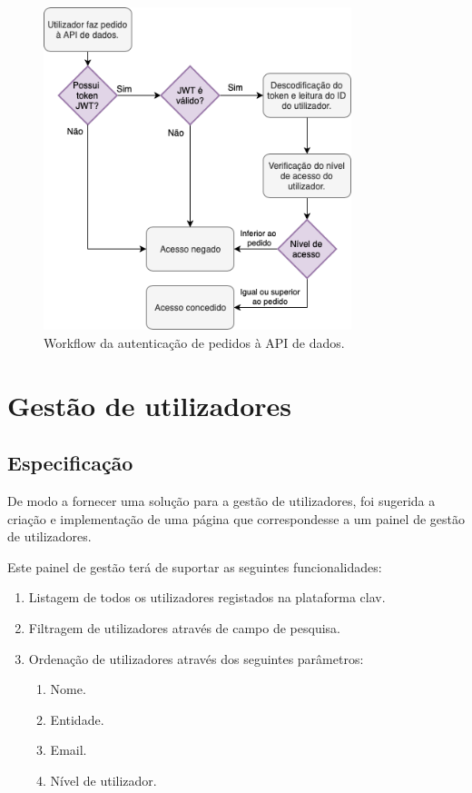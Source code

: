 \begin{figure}[h!]
    \centering
    \includegraphics[width=0.8\textwidth]{img/diagramas/authAPI/AuthAPI.png}
    \caption{Workflow da autenticação de pedidos à API de dados.}
    \label{fig:flow_authCC}
\end{figure}

\cleardoublepage
\section{Gestão de utilizadores}

\subsection{Especificação}
De modo a fornecer uma solução para a gestão de utilizadores, foi sugerida a criação e implementação de uma página que correspondesse a um painel de gestão de utilizadores.

Este painel de gestão terá de suportar as seguintes funcionalidades:

\begin{enumerate}
    \item Listagem de todos os utilizadores registados na plataforma \gls{clav}.
    \item Filtragem de utilizadores através de campo de pesquisa.
    \item Ordenação de utilizadores através dos seguintes parâmetros:
    \begin{enumerate}
        \item Nome.
        \item Entidade.
        \item Email.
        \item Nível de utilizador.
    \end{enumerate}
\end{enumerate}

